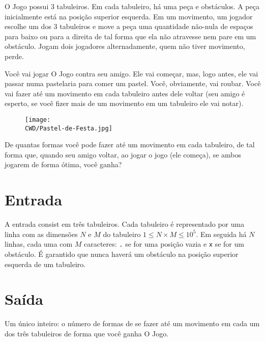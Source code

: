 %

O Jogo possui 3 tabuleiros. Em cada tabuleiro, há uma peça e obstáculos. A peça inicialmente está na posição superior esquerda. Em um movimento, um jogador escolhe um dos 3 tabuleiros e move a peça uma quantidade não-nula de espaços para baixo ou para a direita de tal forma que ela não atravesse nem pare em um obstáculo. Jogam dois jogadores alternadamente, quem não tiver movimento, perde.

Você vai jogar O Jogo contra seu amigo. Ele vai começar, mas, logo antes, ele vai passar numa pastelaria para comer um pastel. Você, obviamente, vai roubar. Você vai fazer até um movimento em cada tabuleiro antes dele voltar (seu amigo é esperto, se você fizer mais de um movimento em um tabuleiro ele vai notar).

\begin{figure}[H]
    \centering
    \texttt{[image: \\CWD/Pastel-de-Festa.jpg]}
  \end{figure}

De quantas formas você pode fazer até um movimento em cada tabuleiro, de tal forma que, quando seu amigo voltar, ao jogar o jogo (ele começa), se ambos jogarem de forma ótima, você ganha?

%
%

\section*{Entrada}

A entrada consist em três tabuleiros. Cada tabuleiro é representado por uma linha com as dimensões $N$ e $M$ do tabuleiro $1 \leq N\times M \leq 10^5$. Em seguida há $N$ linhas, cada uma com $M$ caracteres: {\tt .} se for uma posição vazia e {\tt x} se for um obstáculo. É garantido que nunca haverá um obstáculo na posição superior esquerda de um tabuleiro.

%
%

\section*{Saída}

Um único inteiro: o número de formas de se fazer até um movimento em cada um dos três tabuleiros de forma que você ganha O Jogo.

